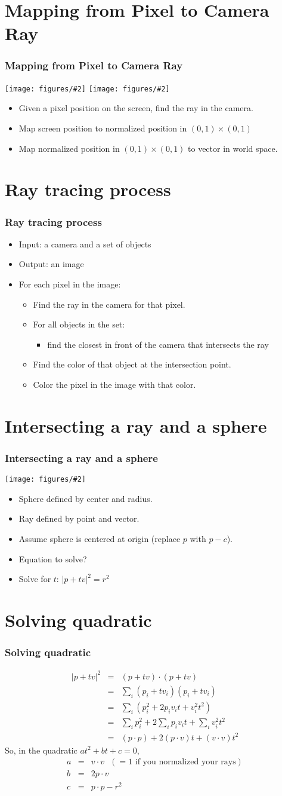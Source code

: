 \documentclass[slidestop,xcolor=pst]{beamer}
\newcommand{\mygraph}[2]{\texttt{[image: figures/\#2]}}
\newcommand{\sect}[1]{
\section{#1}
\begin{frame}[fragile]\frametitle{#1}
}
\newcommand{\bi}{\begin{itemize}}
\newcommand{\ei}{\end{itemize}}
\begin{document}
\sect{Mapping from Pixel to Camera Ray}
\mygraph{.4}{mapping01.png}
\hfill
\mygraph{.5}{mapping02.png}

\begin{itemize}
\item Given a pixel position on the screen, find the ray in the camera.
\item Map screen position to normalized position in $(0,1)\times(0,1)$
\item Map normalized position in $(0,1)\times(0,1)$ to vector in world space.
\end{itemize}
\end{frame}

\sect{Ray tracing process}
\bi
\item Input: a camera and a set of objects
\item Output: an image
\item For each pixel in the image:
  \bi
  \item Find the ray in the camera for that pixel.
  \item For all objects in the set:
    \bi
    \item find the closest in front of the camera that intersects the ray
    \ei
  \item Find the color of that object at the intersection point.
  \item Color the pixel in the image with that color.
  \ei
\ei
\end{frame}

\sect{Intersecting a ray and a sphere}
\mygraph{.9}{intersectingraysphere.png}
\begin{itemize}
  \item Sphere defined by center and radius.
\item Ray defined by point and vector.
\item Assume sphere is centered at origin (replace $p$ with $p-c$).
\item Equation to solve?
\pause
\item Solve for $t$:  $|p+tv|^2 = r^2$
\end{itemize}
\end{frame}

\sect{Solving quadratic}
\begin{eqnarray*}
|p+tv|^2 &=& (p+tv)\cdot(p+tv)\\
&=& \sum_i (p_i + tv_i)(p_i + tv_i)\\
&=& \sum_i \left(p_i^2 + 2p_iv_it + v_i^2t^2\right)\\
&=& \sum_i p_i^2 + 2\sum_ip_iv_it + \sum_iv_i^2t^2\\
&=& (p\cdot p) + 2(p\cdot v) t+ (v\cdot v) t^2
\end{eqnarray*}
So, in the quadratic $at^2 + bt + c = 0$,
\begin{eqnarray*}
a &=& v\cdot v \ \ \ (= 1 \mbox{~if you normalized your rays})\\
b &=& 2p\cdot v\\
c &=& p\cdot p - r^2
\end{eqnarray*}
\end{frame}
\end{document}
